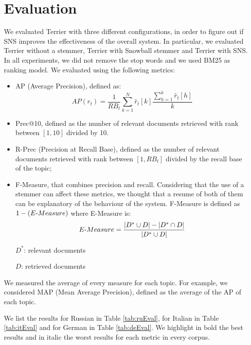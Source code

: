 \section{Evaluation}
We evaluated Terrier\cite{terrier} with three different configurations, in order to figure out if SNS improves the effectiveness of the overall system. In particular, we evaluated Terrier without a stemmer, Terrier with Snowball\cite{snowball} stemmer and Terrier with SNS. In all experiments, we did not remove the stop words and we used BM25 as ranking model. We evaluated using the following metrics:

\begin{itemize}
\item AP (Average Precision), defined as:
\begin{equation}
AP(r_t)=\frac{1}{RB_t}\sum_{k=1}^{N}\widetilde{r_t}[k]\frac{\sum_{h=1}^{k}\widetilde{r_t}[h]}{k}
\end{equation}

\item Prec@10, defined as the number of relevant documents retrieved with rank between $[1, 10]$ divided by 10.

\item R-Prec (Precision at Recall Base), defined as the number of relevant documents retrieved with rank between $[1,RB_t]$ divided by the recall base of the topic;

\item F-Measure, that combines precision and recall. Considering that the use of a stemmer can affect these metrics, we thought that a resume of both of them can be explanatory of the behaviour of the system. F-Measure is defined as $1 - (E\textnormal{-}Measure)$ where E-Measure is:
\begin{equation}
E\textnormal{-}Measure=\frac{|D^{*}\cup D|-|D^{*}\cap D|}{|D^{*}\cup D|}
\end{equation}

$D^{*}$: relevant documents

$D$: retrieved documents

\end{itemize}

We measured the average of every measure for each topic. For example, we considered MAP (Mean Average Precision), defined as the average of the AP of each topic.

We list the results for Russian in Table \ref{tab:ruEval}, for Italian in Table \ref{tab:itEval} and for German in Table \ref{tab:deEval}. We highlight in bold the best results and in italic the worst results for each metric in every corpus.

